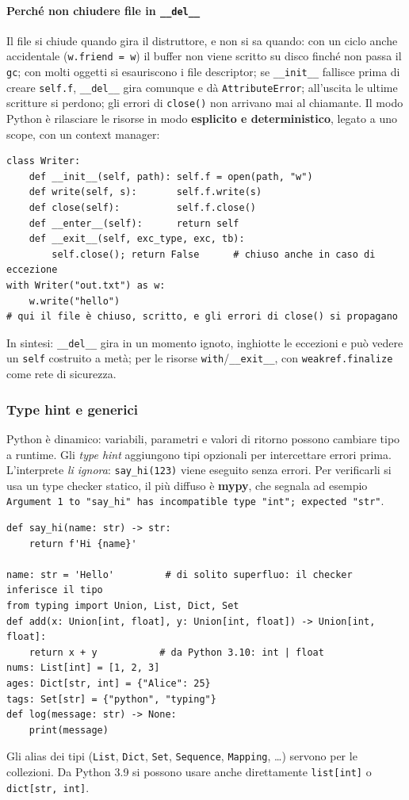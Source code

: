 \documentclass[a4paper,12pt]{article}
\begin{document}
\paragraph{Perché non chiudere file in \texttt{\_\_del\_\_}} Il file si chiude quando gira il
distruttore, e non si sa quando: con un ciclo anche accidentale (\texttt{w.friend = w}) il buffer
non viene scritto su disco finché non passa il \texttt{gc}; con molti oggetti si esauriscono i
file descriptor; se \texttt{\_\_init\_\_} fallisce prima di creare \texttt{self.f},
\texttt{\_\_del\_\_} gira comunque e dà \texttt{AttributeError}; all'uscita le ultime scritture
si perdono; gli errori di \texttt{close()} non arrivano mai al chiamante. Il modo Python è
rilasciare le risorse in modo \textbf{esplicito e deterministico}, legato a uno scope, con un
context manager:
\begin{verbatim}
class Writer:
    def __init__(self, path): self.f = open(path, "w")
    def write(self, s):       self.f.write(s)
    def close(self):          self.f.close()
    def __enter__(self):      return self
    def __exit__(self, exc_type, exc, tb):
        self.close(); return False      # chiuso anche in caso di eccezione
with Writer("out.txt") as w:
    w.write("hello")
# qui il file è chiuso, scritto, e gli errori di close() si propagano
\end{verbatim}
In sintesi: \texttt{\_\_del\_\_} gira in un momento ignoto, inghiotte le eccezioni e può vedere
un \texttt{self} costruito a metà; per le risorse \texttt{with}/\texttt{\_\_exit\_\_}, con
\texttt{weakref.finalize} come rete di sicurezza.

\subsubsection{Type hint e generici}
Python è dinamico: variabili, parametri e valori di ritorno possono cambiare tipo a runtime.
Gli \emph{type hint} aggiungono tipi opzionali per intercettare errori prima. L'interprete
\emph{li ignora}: \texttt{say\_hi(123)} viene eseguito senza errori. Per verificarli si usa un
type checker statico, il più diffuso è \textbf{mypy}, che segnala ad esempio
\texttt{Argument 1 to "say\_hi" has incompatible type "int"; expected "str"}.
\begin{verbatim}
def say_hi(name: str) -> str:
    return f'Hi {name}'

name: str = 'Hello'         # di solito superfluo: il checker inferisce il tipo
from typing import Union, List, Dict, Set
def add(x: Union[int, float], y: Union[int, float]) -> Union[int, float]:
    return x + y           # da Python 3.10: int | float
nums: List[int] = [1, 2, 3]
ages: Dict[str, int] = {"Alice": 25}
tags: Set[str] = {"python", "typing"}
def log(message: str) -> None:
    print(message)
\end{verbatim}
Gli alias dei tipi (\texttt{List}, \texttt{Dict}, \texttt{Set}, \texttt{Sequence},
\texttt{Mapping}, \dots) servono per le collezioni. Da Python 3.9 si possono usare anche
direttamente \texttt{list[int]} o \texttt{dict[str, int]}.
\end{document}
